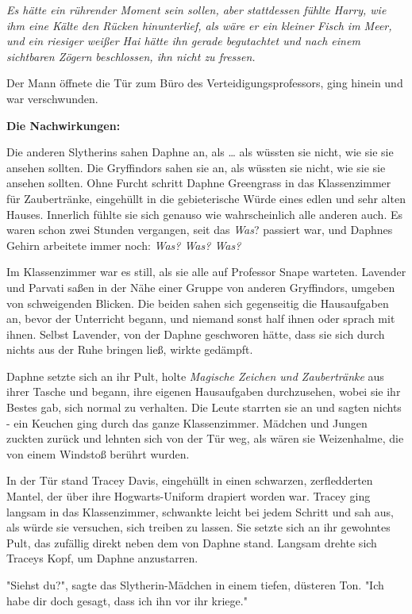 {\emph{Es hätte ein rührender Moment sein sollen, aber stattdessen fühlte Harry, wie ihm eine Kälte den Rücken hinunterlief, als wäre er ein kleiner Fisch im Meer, und ein riesiger weißer Hai hätte ihn gerade begutachtet und nach einem sichtbaren Zögern beschlossen, ihn nicht zu fressen.}

Der Mann öffnete die Tür zum Büro des Verteidigungsprofessors, ging hinein und war verschwunden.

\textbf{Die Nachwirkungen:}

Die anderen Slytherins sahen Daphne an, als … als wüssten sie nicht, wie sie sie ansehen sollten. Die Gryffindors sahen sie an, als wüssten sie nicht, wie sie sie ansehen sollten. Ohne Furcht schritt Daphne Greengrass in das Klassenzimmer für Zaubertränke, eingehüllt in die gebieterische Würde eines edlen und sehr alten Hauses. Innerlich fühlte sie sich genauso wie wahrscheinlich alle anderen auch. Es waren schon zwei Stunden vergangen, seit das \emph{Was}? passiert war, und Daphnes Gehirn arbeitete immer noch: \emph{Was? Was? Was?}

Im Klassenzimmer war es still, als sie alle auf Professor Snape warteten. Lavender und Parvati saßen in der Nähe einer Gruppe von anderen Gryffindors, umgeben von schweigenden Blicken. Die beiden sahen sich gegenseitig die Hausaufgaben an, bevor der Unterricht begann, und niemand sonst half ihnen oder sprach mit ihnen. Selbst Lavender, von der Daphne geschworen hätte, dass sie sich durch nichts aus der Ruhe bringen ließ, wirkte gedämpft.

Daphne setzte sich an ihr Pult, holte \emph{Magische Zeichen und Zaubertränke} aus ihrer Tasche und begann, ihre eigenen Hausaufgaben durchzusehen, wobei sie ihr Bestes gab, sich normal zu verhalten. Die Leute starrten sie an und sagten nichts - ein Keuchen ging durch das ganze Klassenzimmer. Mädchen und Jungen zuckten zurück und lehnten sich von der Tür weg, als wären sie Weizenhalme, die von einem Windstoß berührt wurden.

In der Tür stand Tracey Davis, eingehüllt in einen schwarzen, zerfledderten Mantel, der über ihre Hogwarts-Uniform drapiert worden war. Tracey ging langsam in das Klassenzimmer, schwankte leicht bei jedem Schritt und sah aus, als würde sie versuchen, sich treiben zu lassen. Sie setzte sich an ihr gewohntes Pult, das zufällig direkt neben dem von Daphne stand. Langsam drehte sich Traceys Kopf, um Daphne anzustarren.

"Siehst du?", sagte das Slytherin-Mädchen in einem tiefen, düsteren Ton. "Ich habe dir doch gesagt, dass ich ihn vor ihr kriege."

}
